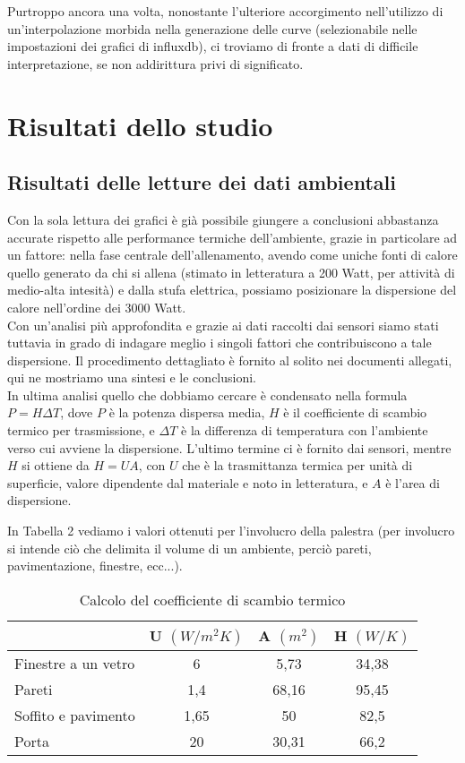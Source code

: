 \documentclass[fleqn,10pt]{SelfArx} %
\begin{document}
Purtroppo ancora una volta, nonostante l'ulteriore accorgimento nell'utilizzo di un'interpolazione morbida nella generazione delle 
curve (selezionabile nelle impostazioni dei grafici di influxdb), ci troviamo di fronte a dati di difficile interpretazione, se non 
addirittura privi di significato.

\section{Risultati dello studio}

\subsection{Risultati delle letture dei dati ambientali}
Con la sola lettura dei grafici è già possibile giungere a conclusioni abbastanza accurate rispetto alle performance termiche 
dell'ambiente, grazie in particolare ad un fattore: nella fase centrale dell'allenamento, avendo come uniche fonti di calore 
quello generato da chi si allena (stimato in letteratura a 200 Watt, per attività di medio-alta intesità) e dalla stufa 
elettrica, possiamo posizionare la dispersione del calore nell'ordine dei 3000 Watt. \\
Con un'analisi più approfondita e grazie ai dati raccolti dai sensori siamo stati tuttavia in grado di indagare meglio i 
singoli fattori che contribuiscono a tale dispersione. Il procedimento dettagliato è fornito al solito nei documenti allegati, 
qui ne mostriamo una sintesi e le conclusioni.\\

In ultima analisi quello che dobbiamo cercare è condensato nella formula $ P = H \Delta T $, dove $ P $ è la potenza dispersa 
media, $ H $ è il coefficiente di scambio termico per trasmissione, e $ \Delta T $ è la differenza di temperatura con l'ambiente 
verso cui avviene la dispersione. L'ultimo termine ci è fornito dai sensori, mentre $ H $ si ottiene da $ H = U A $, 
con $ U $ che è la trasmittanza termica per unità di superficie, valore dipendente dal materiale e noto in letteratura, 
e $ A $ è l'area di dispersione.

In Tabella 2 vediamo i valori ottenuti per l'involucro della palestra (per involucro si intende ciò che delimita il volume di un 
ambiente, perciò pareti, pavimentazione, finestre, ecc...).

\begin{table}[hbt]
	\caption{Calcolo del coefficiente di scambio termico}
	\centering
	\begin{tabular}{lccc}
		\toprule
			 & \textbf{U} $ (W/m^2K) $ & \textbf{A} $ (m^2) $ & \textbf{H} $ (W/K) $ \\
		\midrule
		Finestre a un vetro & 6 & 5,73 & 34,38 \\
		Pareti & 1,4 & 68,16 & 95,45 \\
		Soffito e pavimento & 1,65 & 50 & 82,5 \\
		Porta & 20 & 30,31 & 66,2 \\
		\bottomrule
	\end{tabular}
	\label{tab:label}
\end{table}
\end{document}
